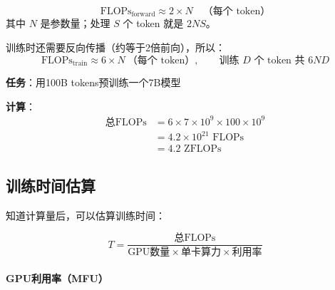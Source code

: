 \begin{keyformula}[title=Transformer计算量估算]
\begin{equation}
    \text{FLOPs}_{\text{forward}} \approx 2 \times N \quad \text{（每个 token）}
\end{equation}
其中 $N$ 是参数量；处理 $S$ 个 token 就是 $2NS$。

训练时还需要反向传播（约等于2倍前向），所以：
\begin{equation}
    \text{FLOPs}_{\text{train}} \approx 6 \times N \ \text{（每个 token）}, \qquad \text{训练 } D \text{ 个 token 共 } 6ND
\end{equation}
\end{keyformula}


\begin{example}[训练计算量估算]
\textbf{任务}：用100B tokens预训练一个7B模型

\textbf{计算}：
\begin{align}
    \text{总FLOPs} &= 6 \times 7 \times 10^9 \times 100 \times 10^9 \\
    &= 4.2 \times 10^{21} \text{ FLOPs} \\
    &= 4.2 \text{ ZFLOPs}
\end{align}
\end{example}

\subsection*{训练时间估算}

知道计算量后，可以估算训练时间：

\begin{keyformula}[title=训练时间估算]
\begin{equation}
    T = \frac{\text{总FLOPs}}{\text{GPU数量} \times \text{单卡算力} \times \text{利用率}}
\end{equation}
\end{keyformula}

\paragraph{GPU利用率（MFU）}

